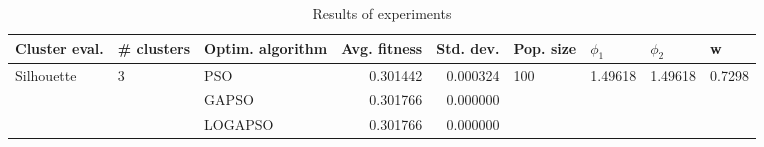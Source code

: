 \begin{table}
\centering
\caption{Results of experiments}
\begin{tabular}{lllrrllll}
\toprule
              Cluster eval. &        \# clusters & Optim. algorithm &  Avg. fitness &  Std. dev. &            Pop. size &               $\phi_{1}$ &               $\phi_{2}$ &                       w \\
\midrule
\multirow{3}{*}{Silhouette} & \multirow{3}{*}{3} &              PSO &      0.301442 &   0.000324 & \multirow{3}{*}{100} & \multirow{3}{*}{1.49618} & \multirow{3}{*}{1.49618} & \multirow{3}{*}{0.7298} \\
                            &                    &            GAPSO &      0.301766 &   0.000000 &                      &                          &                          &                         \\
                            &                    &          LOGAPSO &      0.301766 &   0.000000 &                      &                          &                          &                         \\
\bottomrule
\end{tabular}
\end{table}
